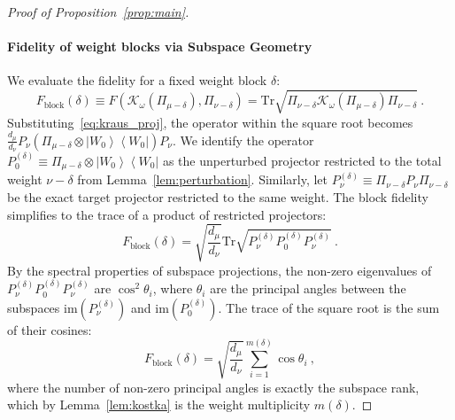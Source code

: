 \documentclass[11pt,letterpaper]{article}
\newcommand{\ketbra}[2]{\left|#1\right\rangle\!\!\left\langle #2\right|}
\begin{document}
\begin{proof}[Proof of Proposition~\ref{prop:main}]
\paragraph{Fidelity of weight blocks via Subspace Geometry}
We evaluate the fidelity for a fixed weight block $\delta$:
\begin{equation}
    F_{\mathrm{block}}(\delta) \equiv F(\mathcal{K}_\omega(\Pi_{\mu-\delta}), \Pi_{\nu-\delta}) = \mathrm{Tr} \sqrt{ \Pi_{\nu-\delta} \mathcal{K}_\omega(\Pi_{\mu-\delta}) \Pi_{\nu-\delta} } \ .
\end{equation}
Substituting~\eqref{eq:kraus_proj}, the operator within the square root becomes $\frac{d_\mu}{d_\nu} P_\nu (\Pi_{\mu-\delta} \otimes \ketbra{W_0}{W_0}) P_\nu$.
We identify the operator $P_0^{(\delta)} \equiv \Pi_{\mu-\delta} \otimes \ketbra{W_0}{W_0}$ as the unperturbed projector restricted to the total weight $\nu-\delta$ from Lemma~\ref{lem:perturbation}. Similarly, let $P_\nu^{(\delta)} \equiv \Pi_{\nu-\delta} P_\nu \Pi_{\nu-\delta}$ be the exact target projector restricted to the same weight. 
The block fidelity simplifies to the trace of a product of restricted projectors:
\begin{equation}
    F_{\mathrm{block}}(\delta) = \sqrt{\frac{d_\mu}{d_\nu}} \mathrm{Tr} \sqrt{ P_\nu^{(\delta)} P_0^{(\delta)} P_\nu^{(\delta)} } \ .
\end{equation}
By the spectral properties of subspace projections, the non-zero eigenvalues of $P_\nu^{(\delta)} P_0^{(\delta)} P_\nu^{(\delta)}$ are $\cos^2 \theta_i$, where $\theta_i$ are the principal angles between the subspaces $\mathrm{im}(P_\nu^{(\delta)})$ and $\mathrm{im}(P_0^{(\delta)})$. The trace of the square root is the sum of their cosines:
\begin{equation}
    F_{\mathrm{block}}(\delta) = \sqrt{\frac{d_\mu}{d_\nu}} \sum_{i=1}^{m(\delta)} \cos \theta_i \ ,
\end{equation}
where the number of non-zero principal angles is exactly the subspace rank, which by Lemma~\ref{lem:kostka} is the weight multiplicity $m(\delta)$.


\end{proof}
\end{document}
